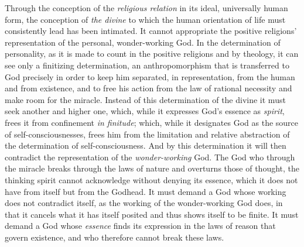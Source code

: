 \documentclass[12pt,a4paper,openany]{book}
\newcommand{\opage}[1]{\marginnote{\footnotesize\textit{[#1]}}}
\begin{document}
Through the conception of the \emph{religious relation} in its ideal,
universally human form, the conception of \emph{the divine} to which
the human orientation of life must consistently lead has been
intimated. It cannot appropriate the positive religions'
representation of the personal, wonder-working God. In the
determination of personality, as it is made to count in the positive
religions and by theology, it can see only a finitizing
determination,
an anthropomorphism that is transferred to God precisely in order to
keep him separated, in representation, from the human and
\opage{501}from existence, and to free his action from the law of rational
necessity and make room for the miracle. Instead of this
determination of the divine it must seek another and higher one,
which, while it expresses God's essence as \emph{spirit}, frees it
from confinement \emph{in finitude}; which, while it designates God
as the source of self-consciousnesses, frees him from the limitation
and relative abstraction of the determination of self-consciousness.
And by this determination it will then contradict the representation
of the \emph{wonder-working} God. The God who through the miracle breaks
through the laws of nature and overturns those of thought, the
thinking spirit cannot acknowledge without denying its essence, which
it does not have from itself but from the Godhead. It must demand a
God whose working does not contradict itself, as the working of the
wonder-working God does, in that it cancels what it has itself
posited and thus shows itself to be finite. It must demand a God whose
\emph{essence} finds its expression in the laws of reason that govern
existence, and who therefore cannot break these laws.
\end{document}
